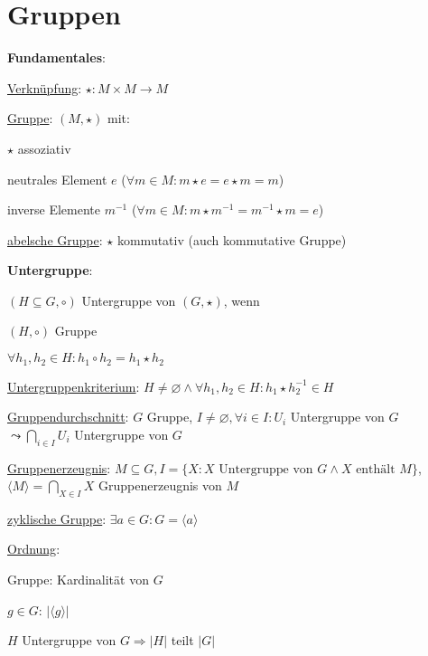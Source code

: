 \section{\label{sec:Gruppen}Gruppen}

  \textbf{Fundamentales}:
  \begin{items}
    \item \underline{Verknüpfung}: $\star : M \times M \rightarrow M$
    \item \underline{Gruppe}: $(M,\star)$ mit:
      \begin{enumeration}
        \item $\star$ assoziativ
        \item neutrales Element $e$ ($\forall m \in M: m \star e = e \star m = m$)
        \item inverse Elemente $m^{-1}$ ($\forall m \in M: m \star m^{-1} = m^{-1} \star m = e$)
      \end{enumeration}
    \item \underline{abelsche Gruppe}: $\star$ kommutativ (auch kommutative Gruppe)
  \end{items}

  \textbf{Untergruppe}:
  \begin{items}
    \item $(H \subseteq G, \circ)$ Untergruppe von $(G, \star)$, wenn
    \begin{enumeration}
      \item $(H, \circ)$ Gruppe
      \item $\forall h_1, h_2 \in H: h_1 \circ h_2 = h_1 \star h_2$
    \end{enumeration}
    \item \underline{Untergruppenkriterium}: $H \neq \varnothing \wedge \forall h_1, h_2 \in H: h_1 \star h_2^{-1} \in H$
    \item \underline{Gruppendurchschnitt}: $G$ Gruppe, $I \neq \varnothing, \forall i \in I: U_i$ Untergruppe von $G$ $\leadsto \bigcap_{i \in I} U_i$ Untergruppe von $G$
    \item \underline{Gruppenerzeugnis}: $M \subseteq G, I=\{ X: X \text{ Untergruppe von } G \wedge X \text{ enthält } M\}$, $\langle M \rangle=\bigcap_{X \in I} X$ Gruppenerzeugnis von $M$
    \item \underline{zyklische Gruppe}: $\exists a \in G: G = \langle a \rangle$
    \item \underline{Ordnung}:
    \begin{enumeration}
      \item Gruppe: Kardinalität von $G$
      \item $g \in G$: $|\langle g \rangle |$
    \end{enumeration}
    \item $H$ Untergruppe von $G \Rightarrow |H|$ teilt $|G|$
  \end{items}

